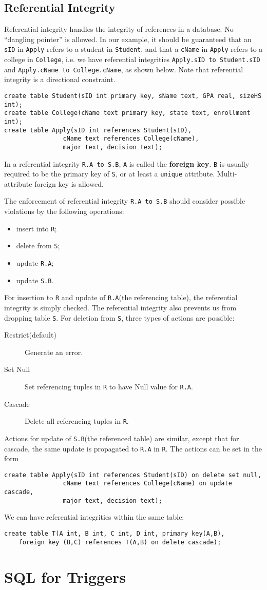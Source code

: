 \subsection{Referential Integrity}
Referential integrity handles the integrity of references in a database. No ``dangling pointer'' is allowed. In our example, it should be guaranteed that an \texttt{sID} in \texttt{Apply} refers to a student in \texttt{Student}, and that a \texttt{cName} in \texttt{Apply} refers to a college in \texttt{College}, i.e. we have referential integrities \texttt{Apply.sID to Student.sID} and \texttt{Apply.cName to College.cName}, as shown below. Note that referential integrity is a directional constraint. 
\begin{lstlisting}
create table Student(sID int primary key, sName text, GPA real, sizeHS int);
create table College(cName text primary key, state text, enrollment int);
create table Apply(sID int references Student(sID), 
				cName text references College(cName),
				major text, decision text);
\end{lstlisting}

In a referential integrity \texttt{R.A to S.B}, \texttt{A} is called the \textbf{foreign key}. \texttt{B} is usually required to be the primary key of \texttt{S}, or at least a \texttt{unique} attribute. Multi-attribute foreign key is allowed. 

The enforcement of referential integrity \texttt{R.A to S.B} should consider possible violations by the following operations: 
\begin{itemize}
\item insert into \texttt{R};
\item delete from \texttt{S};
\item update \texttt{R.A};
\item update \texttt{S.B}.
\end{itemize}
For insertion to \texttt{R} and update of \texttt{R.A}(the referencing table), the referential integrity is simply checked. The referential integrity also prevents us from dropping table \texttt{S}. For deletion from \texttt{S}, three types of actions are possible:
\begin{description}
\item[Restrict(default)]Generate an error.
\item[Set Null]Set referencing tuples in \texttt{R} to have Null value for \texttt{R.A}.
\item[Cascade]Delete all referencing tuples in \texttt{R}. 
\end{description}
Actions for update of \texttt{S.B}(the referenced table) are similar, except that for cascade, the same update is propagated to \texttt{R.A} in \texttt{R}. The actions can be set in the form
\begin{lstlisting}
create table Apply(sID int references Student(sID) on delete set null, 
				cName text references College(cName) on update cascade,
				major text, decision text);
\end{lstlisting}
We can have referential integrities within the same table:
\begin{lstlisting}
create table T(A int, B int, C int, D int, primary key(A,B), 
	foreign key (B,C) references T(A,B) on delete cascade);
\end{lstlisting}
\section{SQL for Triggers}
\ifx\PREAMBLE\undefined

\fi